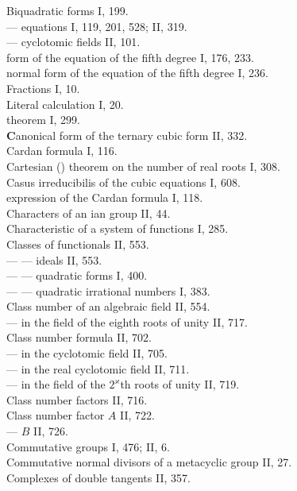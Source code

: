 \noindent
Biquadratic forms I, 199.\\
--- equations I, 119, 201, 528; II, 319.\\
--- cyclotomic fields II, 101.\\
 form of the equation of the fifth degree I, 176, 233.\\
 normal form of the equation of the fifth degree I, 236.\\
Fractions I, 10.\\
Literal calculation I, 20.\\
 theorem I, 299.\\

\medskip
\noindent
\textbf{C}anonical form of the ternary cubic form II, 332.\\
Cardan formula I, 116.\\
Cartesian () theorem on the number of real roots I, 308.\\
Casus irreducibilis of the cubic equations I, 608.\\
 expression of the Cardan formula I, 118.\\
Characters of an ian group II, 44.\\
Characteristic of a system of functions I, 285.\\
Classes of functionals II, 553.\\
--- --- ideals II, 553.\\
--- --- quadratic forms I, 400.\\
--- --- quadratic irrational numbers I, 383.\\
Class number of an algebraic field II, 554.\\
--- in the field of the eighth roots of unity II, 717.\\
Class number formula II, 702.\\
--- in the cyclotomic field II, 705.\\
--- in the real cyclotomic field II, 711.\\
--- in the field of the $2^{\varkappa}$th roots of unity II, 719.\\
Class number factors II, 716.\\
Class number factor $A$ II, 722.\\
--- $B$ II, 726.\\
Commutative groups I, 476; II, 6.\\
Commutative normal divisors of a metacyclic group II, 27.\\
Complexes of double tangents II, 357.\\

